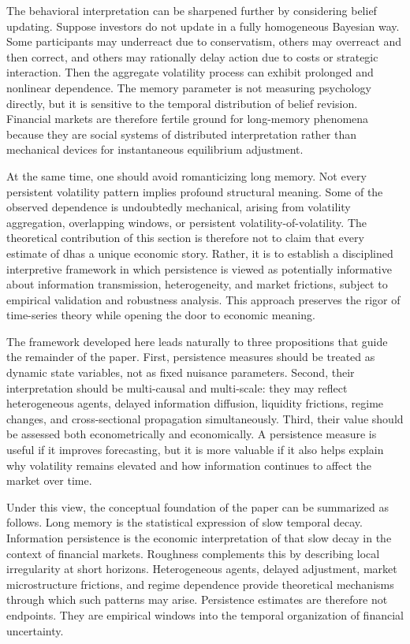 \documentclass[12pt]{article}
\begin{document}
The behavioral interpretation can be sharpened further by considering belief updating. Suppose investors do not update in a fully homogeneous Bayesian way. Some participants may underreact due to conservatism, others may overreact and then correct, and others may rationally delay action due to costs or strategic interaction. Then the aggregate volatility process can exhibit prolonged and nonlinear dependence. The memory parameter is not measuring psychology directly, but it is sensitive to the temporal distribution of belief revision. Financial markets are therefore fertile ground for long-memory phenomena because they are social systems of distributed interpretation rather than mechanical devices for instantaneous equilibrium adjustment.

At the same time, one should avoid romanticizing long memory. Not every persistent volatility pattern implies profound structural meaning. Some of the observed dependence is undoubtedly mechanical, arising from volatility aggregation, overlapping windows, or persistent volatility-of-volatility. The theoretical contribution of this section is therefore not to claim that every estimate of dhas a unique economic story. Rather, it is to establish a disciplined interpretive framework in which persistence is viewed as potentially informative about information transmission, heterogeneity, and market frictions, subject to empirical validation and robustness analysis. This approach preserves the rigor of time-series theory while opening the door to economic meaning.

The framework developed here leads naturally to three propositions that guide the remainder of the paper. First, persistence measures should be treated as dynamic state variables, not as fixed nuisance parameters. Second, their interpretation should be multi-causal and multi-scale: they may reflect heterogeneous agents, delayed information diffusion, liquidity frictions, regime changes, and cross-sectional propagation simultaneously. Third, their value should be assessed both econometrically and economically. A persistence measure is useful if it improves forecasting, but it is more valuable if it also helps explain why volatility remains elevated and how information continues to affect the market over time.

Under this view, the conceptual foundation of the paper can be summarized as follows. Long memory is the statistical expression of slow temporal decay. Information persistence is the economic interpretation of that slow decay in the context of financial markets. Roughness complements this by describing local irregularity at short horizons. Heterogeneous agents, delayed adjustment, market microstructure frictions, and regime dependence provide theoretical mechanisms through which such patterns may arise. Persistence estimates are therefore not endpoints. They are empirical windows into the temporal organization of financial uncertainty.
\end{document}
